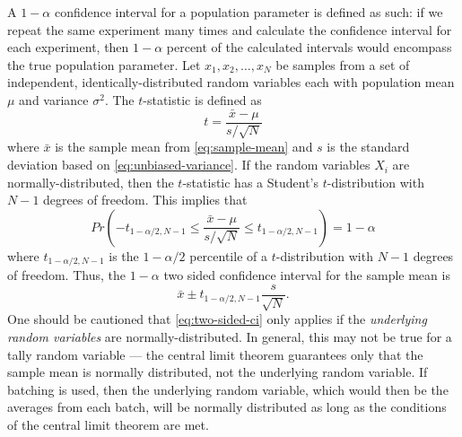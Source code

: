 A $1-\alpha$ confidence interval for a population parameter is defined as
such: if we repeat the same experiment many times and calculate the confidence
interval for each experiment, then $1 - \alpha$ percent of the calculated
intervals would encompass the true population parameter. Let $x_1, x_2,
\dots, x_N$ be samples from a set of independent, identically-distributed random
variables each with population mean $\mu$ and variance
$\sigma^2$. The $t$-statistic is defined as
\begin{equation}
  \label{eq:t-statistic}
  t = \frac{\bar{x} - \mu}{s/\sqrt{N}}
\end{equation}
where $\bar{x}$ is the sample mean from \eqref{eq:sample-mean} and $s$ is the
standard deviation based on \eqref{eq:unbiased-variance}. If the random
variables $X_i$ are normally-distributed, then the $t$-statistic has a Student's
$t$-distribution with $N-1$ degrees of freedom. This implies that
\begin{equation}
  \label{eq:t-probability}
  Pr \left ( -t_{1 - \alpha/2, N - 1} \le \frac{\bar{x} - \mu}{s/\sqrt{N}} \le
  t_{1 - \alpha/2, N - 1} \right ) = 1 - \alpha
\end{equation}
where $t_{1-\alpha/2, N-1}$ is the $1 - \alpha/2$ percentile of a
$t$-distribution with $N-1$ degrees of freedom. Thus, the $1 - \alpha$ two sided
confidence interval for the sample mean is
\begin{equation}
  \label{eq:two-sided-ci}
  \bar{x} \pm t_{1 - \alpha/2, N-1} \frac{s}{\sqrt{N}}.
\end{equation}
One should be cautioned that \eqref{eq:two-sided-ci} only applies if the
\emph{underlying random variables} are normally-distributed. In general, this
may not be true for a tally random variable --- the central limit theorem
guarantees only that the sample mean is normally distributed, not the underlying
random variable. If batching is used, then the underlying random variable, which
would then be the averages from each batch, will be normally distributed as long
as the conditions of the central limit theorem are met.

